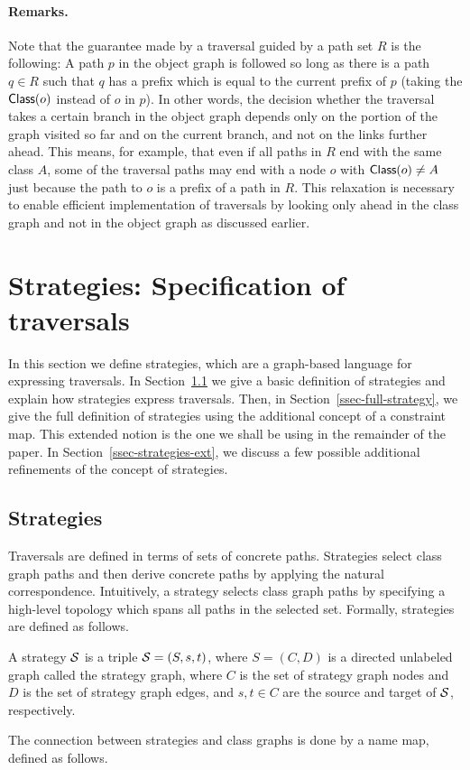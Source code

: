 \paragraph{Remarks.}
Note that the guarantee made by a traversal guided by a path set $R$
is the following: A path $p$ in the object graph is followed so long
as there is a path $q\in R$ such that $q$ has a prefix which is
equal to the current prefix of $p$ (taking the $\mbox{\sf Class}(o)$ instead of
$o$ in $p$). In other words, the decision whether the traversal takes
a certain branch in the object graph depends only on the portion of
the graph visited so far and on the current branch, and not on the
links further ahead. This means, for example, that even if all paths
in $R$ end with the same class $A$, some of the traversal paths may
end with a node $o$ with $\mbox{\sf Class}(o)\ne A$ just because the path to $o$
is a prefix of a path in $R$.  This relaxation is necessary to enable
efficient implementation of traversals by looking only ahead in the
class graph and not in the object graph as discussed earlier.


\section{Strategies: Specification of traversals}
\label{sec-strategy}
In this section we define strategies, which are a graph-based language
for expressing traversals. In Section~\ref{ssec-simple-strategy} we
give a basic definition of strategies and explain how strategies
express traversals.  Then, in Section~\ref{ssec-full-strategy}, we
give the full definition of strategies using the additional concept of
a constraint map. This extended notion is the one we shall be using in
the remainder of the paper. In Section~\ref{ssec-strategies-ext}, we
discuss a few possible additional refinements of the concept of
strategies.

\subsection{Strategies}
\label{ssec-simple-strategy}
Traversals are defined in terms of sets of concrete paths. Strategies
select class graph paths and then derive concrete paths by applying
the natural correspondence.  Intuitively, a strategy selects class
graph paths by specifying a high-level topology which spans all paths
in the selected set.  Formally, strategies are defined as follows.

\begin{definition}
A {\sf strategy} ${\cal S}$ is a triple ${\cal S}=(S,s,t)$, where $S=(C,D)$ is a
directed unlabeled graph called the {\sf strategy graph}, where $C$ is
the set of {\sf strategy graph nodes} and $D$ is the set of {\sf
strategy graph edges}, and $s,t\in C$ are the {\sf source} and {\sf
target} of ${\cal S}$, respectively.
\end{definition}
%
The connection between strategies and class graphs is done by a name map,
defined as follows.

